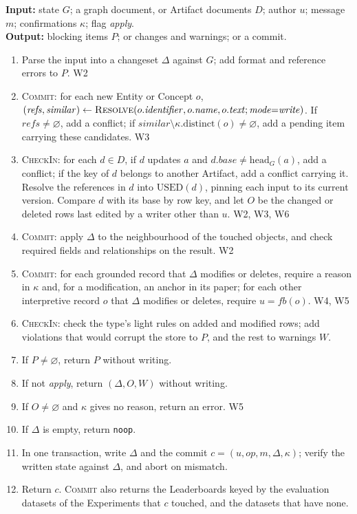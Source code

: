 \documentclass[sigconf,review,anonymous]{acmart}
\begin{document}
\begin{algorithm}[tbp]
\caption{\textsc{Commit} and \textsc{CheckIn}: decide admissibility, then
apply atomically}
\label{alg:commit}
\raggedright
\textbf{Input:} state $G$; a graph document, or Artifact documents $D$;
author $u$; message $m$; confirmations $\kappa$; flag \textit{apply}.\\
\textbf{Output:} blocking items $P$; or changes and warnings; or a commit.
\begin{enumerate}
  \item Parse the input into a changeset $\Delta$ against $G$; add format and
    reference errors to $P$. \hfill W2
  \item \textsc{Commit}: for each new Entity or Concept $o$,
    $(\mathit{refs},\mathit{similar})\gets
    \textsc{Resolve}(o.\mathit{identifier}, o.\mathit{name}, o.\mathit{text};
    \mathit{mode}{=}\mathit{write})$. If $\mathit{refs}\ne\varnothing$, add a
    conflict; if $\mathit{similar}\setminus\kappa.\mathrm{distinct}(o)\ne
    \varnothing$, add a pending item carrying these candidates. \hfill W3
  \item \textsc{CheckIn}: for each $d\in D$, if $d$ updates $a$ and
    $d.\mathit{base}\ne\mathrm{head}_G(a)$, add a conflict; if the key of $d$
    belongs to another Artifact, add a conflict carrying it. Resolve the
    references in $d$ into $\mathrm{USED}(d)$, pinning each input to its
    current version. Compare $d$ with its base by row key, and let $O$ be
    the changed or deleted rows last edited by a writer other than $u$.
    \hfill W2, W3, W6
  \item \textsc{Commit}: apply $\Delta$ to the neighbourhood of the touched
    objects, and check required fields and relationships on the result.
    \hfill W2
  \item \textsc{Commit}: for each grounded record that $\Delta$ modifies or
    deletes, require a reason in $\kappa$ and, for a modification, an anchor
    in its paper; for each other interpretive record $o$ that $\Delta$
    modifies or deletes, require $u=\mathit{fb}(o)$. \hfill W4, W5
  \item \textsc{CheckIn}: check the type's light rules on added and modified
    rows; add violations that would corrupt the store to $P$, and the rest to
    warnings $W$.
  \item If $P\ne\varnothing$, return $P$ without writing.
  \item If not \textit{apply}, return $(\Delta, O, W)$ without writing.
  \item If $O\ne\varnothing$ and $\kappa$ gives no reason, return an error.
    \hfill W5
  \item If $\Delta$ is empty, return \texttt{noop}.
  \item In one transaction, write $\Delta$ and the commit
    $c=(u,\mathit{op},m,\Delta,\kappa)$; verify the written state against
    $\Delta$, and abort on mismatch.
  \item Return $c$. \textsc{Commit} also returns the Leaderboards keyed by
    the evaluation datasets of the Experiments that $c$ touched, and the
    datasets that have none.
\end{enumerate}
\end{algorithm}
\end{document}
